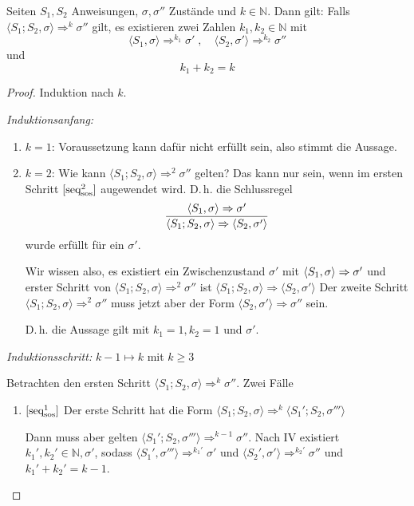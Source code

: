 \begin{lemma}
    Seiten $S_1, S_2$ Anweisungen, $\sigma, \sigma''$ Zustände und $k \in \mathbb{N}$.
    Dann gilt: Falls $\langle S_1; S_2, \sigma \rangle \Rightarrow^k \sigma''$ gilt, es existieren zwei Zahlen $k_1, k_2 \in \mathbb{N}$ mit
    \[
        \langle S_1, \sigma \rangle \Rightarrow^{k_1} \sigma'
        \;,\quad
        \langle S_2, \sigma' \rangle \Rightarrow^{k_2} \sigma''
    \]
    und
    \[
        k_1 + k_2 = k
    \]
\end{lemma}
\begin{proof}
    Induktion nach $k$.

    \emph{Induktionsanfang:}
    \begin{enumerate}
        \item $k = 1$: Voraussetzung kann dafür nicht erfüllt sein, also stimmt die Aussage.
        \item $k = 2$: Wie kann $\langle S_1; S_2, \sigma \rangle \Rightarrow^2 \sigma''$ gelten?
            Das kann nur sein, wenn im ersten Schritt $\infruleSos[2]{seq}$ augewendet wird. D.\,h. die Schlussregel
            \[
                \frac{\stranssos{S_1}{\sigma}{\sigma'}}{\stranssos{S_1; S_2}{\sigma}{\langle S_2, \sigma' \rangle}}
            \]
            wurde erfüllt für ein $\sigma'$.

            Wir wissen also, es existiert ein Zwischenzustand $\sigma'$ mit $\stranssos{S_1}{\sigma}{\sigma'}$ und erster Schritt von $\langle S_1; S_2, \sigma \rangle \Rightarrow^2 \sigma''$ ist $\langle S_1; S_2, \sigma \rangle \Rightarrow \langle S_2, \sigma' \rangle$
            Der zweite Schritt $\langle S_1; S_2, \sigma \rangle \Rightarrow^2 \sigma''$ muss jetzt aber der Form $\langle S_2, \sigma' \rangle \Rightarrow \sigma''$ sein.

            D.\,h. die Aussage gilt mit $k_1 = 1, k_2 = 1$ und $\sigma'$.
    \end{enumerate}

        \par\bigskip
    \emph{Induktionsschritt:} $k - 1 \mapsto k$ mit $k \geq 3$

    Betrachten den ersten Schritt $\langle S_1; S_2, \sigma \rangle \Rightarrow^k \sigma''$.
    Zwei Fälle
    \begin{enumerate}
        \item $\infruleSos[1]{seq}$ Der erste Schritt hat die Form $\langle S_1; S_2, \sigma \rangle \Rightarrow^k \langle S_1'; S_2, \sigma''' \rangle$

            Dann muss aber gelten $\langle S_1'; S_2, \sigma''' \rangle \Rightarrow^{k-1} \sigma''$.
            Nach IV existiert $k_1', k_2' \in \mathbb{N}, \sigma'$, sodass $\langle S_1',  \sigma''' \rangle \Rightarrow^{k_1'} \sigma'$ und $\langle S_2',  \sigma' \rangle \Rightarrow^{k_2'} \sigma''$ und $k_1' + k_2' = k - 1$.


\end{enumerate}
\end{proof}
